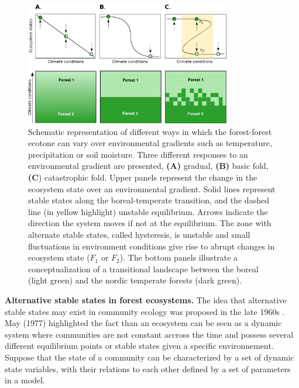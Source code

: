 \begin{figure}[t]
	\begin{center}
	\includegraphics[width=0.8\textwidth]{fig/states.pdf}
	\end{center}
	\caption{Schematic representation of different ways in which the forest-forest ecotone can vary over environmental gradients such as temperature, precipitation
	or soil moisture. Three different responses to an environmental gradient are presented,
	\textbf{(A)} gradual, \textbf{(B)} basic fold, \textbf{(C}) catastrophic fold.
	Upper panels represent the change in the ecosystem state over an environmental gradient. Solid lines represent stable states along the boreal-temperate
	transition, and the dashed line (in yellow highlight) unstable equilibrium. Arrows indicate the
	direction the system moves if not at the equilibrium. The zone with alternate stable states,
	called hysteresis, is unstable and small fluctuations in
	environment conditions give rise to abrupt changes in ecosystem state ($F_1$ or $F_2$). 
	The bottom panels illustrate a conceptualization of a transitional landscape
	between the boreal (light green) and the nordic temperate forests (dark
	green).}
	\label{fig1}
	\vspace{-1.25em}
\end{figure}


\textbf{Alternative stable states in forest ecosystems.} The idea that
alternative stable states may exist in community ecology was proposed in the
late 1960s \cite{Scheffer2001,Society2014a}.  May (1977) \cite{May1977}
highlighted the fact than an ecosystem can be seen as a dynamic system where
communities are not constant accross the time and possess several different
equilibrium points or stable states given a specific environnement.  Suppose
that the state of a community can be characterized by a set of dynamic state
variables, with their relations to each other defined by a set of parameters
in a model.

